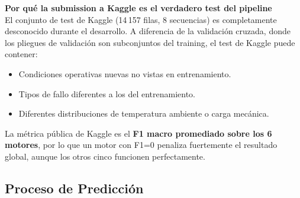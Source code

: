\documentclass[12pt,a4paper]{article}
\begin{document}
\begin{porquebox}
\textbf{Por qu\'{e} la submission a Kaggle es el verdadero test del pipeline}\\[4pt]
El conjunto de test de Kaggle (14\,157 filas, 8 secuencias) es completamente
desconocido durante el desarrollo. A diferencia de la validaci\'{o}n cruzada, donde
los pliegues de validaci\'{o}n son subconjuntos del training, el test de Kaggle puede
contener:
\begin{itemize}[itemsep=2pt]
  \item Condiciones operativas nuevas no vistas en entrenamiento.
  \item Tipos de fallo diferentes a los del entrenamiento.
  \item Diferentes distribuciones de temperatura ambiente o carga mec\'{a}nica.
\end{itemize}
La m\'{e}trica p\'{u}blica de Kaggle es el \textbf{F1 macro promediado sobre los 6 motores},
por lo que un motor con F1=0 penaliza fuertemente el resultado global, aunque los
otros cinco funcionen perfectamente.
\end{porquebox}

\subsection{Proceso de Predicci\'{o}n}
\end{document}
